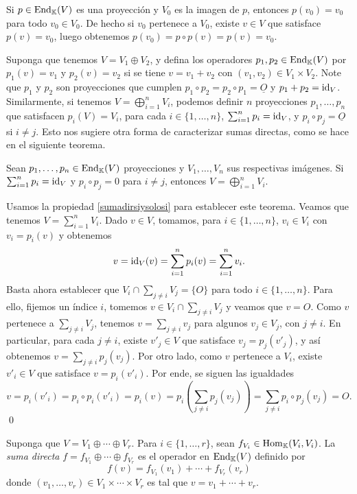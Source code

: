 \begin{obs}
Si $p\in\operatorname{End}_\mathbb{K}(V)$ es una proyecci\'on y $V_0$ es la imagen de $p$, entonces $p(v_0)=v_0$ para todo $v_0\in V_0$. De hecho si $v_0$ pertenece a $V_0$, existe $v\in V$ que satisface $p(v)=v_0$, luego obtenemos $p(v_0)=p\circ p(v)=p(v)=v_0$.
\end{obs}

\begin{obs}\label{sumayproyeccion}
Suponga que tenemos $V=V_1\oplus V_2$, y defina los operadores $p_1,p_2\in\operatorname{End}_\mathbb{K}(V)$ por $p_1(v)=v_1$ y $p_2(v)=v_2$ si se tiene $v=v_1+v_2$ con $(v_1,v_2)\in V_1\times V_2$. Note que $p_1$ y $p_2$ son proyecciones que cumplen $p_1\circ p_2=p_2\circ p_1=\underline{O}$ y $p_1+p_2=\operatorname{id}_V$. Similarmente, si tenemos $V=\bigoplus_{i=1}^{n}V_i$, podemos definir $n$ proyecciones $p_1,\ldots,p_n$ que satisfacen $p_i(V)=V_i$, para cada $i\in\{1,\ldots,n\}$, $\sum_{i=1}^n p_i=\operatorname{id}_V$, y $p_i\circ p_j=\underline{O}$ si $i\ne j$. Esto nos sugiere otra forma de caracterizar sumas directas, como se hace en el siguiente teorema.
\end{obs}

\begin{teo}\label{proysumadir}
Sean $p_1,\ldots,p_n\in\operatorname{End}_\mathbb{K}(V)$ proyecciones y $V_1,\ldots,V_n$ sus respectivas im\'agenes. Si $\sum_{i=1}^n p_i=\operatorname{id}_V$ y $p_i\circ p_j=0$ para $i\ne j$, entonces $V=\bigoplus_{i=1}^n V_i$.
\end{teo}

\dem Usamos la propiedad \ref{sumadirsiysolosi} para establecer este teorema. Veamos que tenemos $V=\sum_{i=1}^nV_i$. Dado $v\in V$, tomamos, para $i\in\{1,\ldots,n\}$, $v_i\in V_i$ con $v_i=p_i(v)$ y obtenemos
\[
v=\operatorname{id}_V(v)=\sum_{i=1}^n p_i(v)=\sum_{i=1}^n v_i.
\]
Basta ahora establecer que $V_i\cap\sum_{j\ne i} V_j=\{O\}$ para todo $i\in\{1,\ldots,n\}$. Para ello, fijemos un índice $i$, tomemos $v\in V_i\cap\sum_{j\ne i} V_j$ y veamos que $v=O$. Como $v$ pertenece a $\sum_{j\ne i} V_j$, tenemos $v=\sum_{j\ne i} v_j$ para algunos $v_j\in V_j$, con $j\ne i$. En particular, para cada $j\ne i$, existe $v'_j\in V$ que satisface $v_j=p_j(v'_j)$, y as\'i obtenemos $v=\sum_{j\ne i} p_j(v_j)$. Por otro lado, como $v$ pertenece a $V_i$, existe $v'_i\in V$ que satisface $v=p_i(v'_i)$. Por ende, se siguen las igualdades
\[
v=p_i(v'_i)=p_i\circ p_i (v'_i)=p_i(v)=p_i\left(\sum_{j\ne i} p_j(v_j)\right)=\sum_{j\ne i} p_i\circ p_j(v_j)=O.
\]
\qed

\begin{defn}\label{sumadirectaoperadores}
  Suponga que $V=V_1\oplus\cdots\oplus V_r$. Para $i\in\{1,\ldots,r\}$, sean $f_{V_i}\in\operatorname{Hom}_\mathbb{K}(V_i,V_i)$. La \emph{suma directa} $f=f_{V_1}\oplus\cdots\oplus f_{V_r}$ es el operador en $\operatorname{End}_\mathbb{K}(V)$ definido por $$f(v)=f_{V_1}(v_1)+\cdots+f_{V_r}(v_r)$$
  donde $(v_1,\ldots,v_r)\in V_1\times\cdots\times V_r$ es tal que $v=v_1+\cdots+v_r$.
\end{defn}

